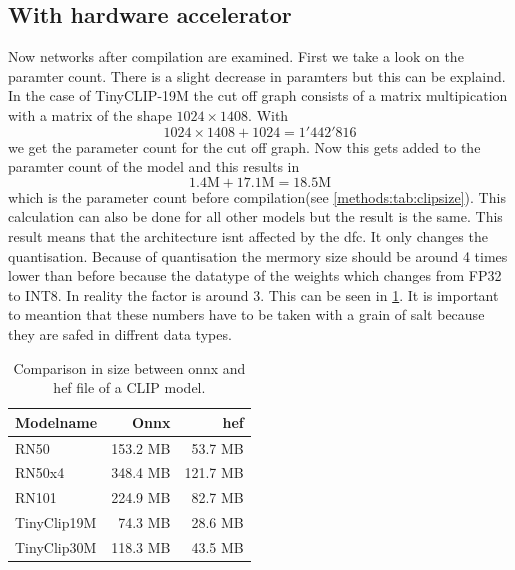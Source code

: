 \subsection{With hardware accelerator}

Now networks after compilation are examined.
First we take a look on the paramter count.
There is a slight decrease in paramters but this can be explaind.
In the case of TinyCLIP-19M the cut off graph consists of a matrix multipication with a matrix of the shape \(1024 \times 1408\).
With 
\begin{equation*}
    1024 \times 1408 + 1024 = 1'442'816
\end{equation*}
we get the parameter count for the cut off graph.
Now this gets added to the paramter count of the model and this results in 
\begin{equation*}
    1.4 \text{M} + 17.1 \text{M} = 18.5 \text{M} 
\end{equation*}
which is the parameter count before compilation(see \cref{methods:tab:clipsize}).
This calculation can also be done for all other models but the result is the same.
This result means that the architecture isnt affected by the \acrshort{dfc}.
It only changes the quantisation.
Because of quantisation the mermory size should be around 4 times lower than before because the datatype of the weights which changes from FP32 to INT8.
In reality the factor is around 3.
This can be seen in \cref{methods:tab:sizecompare}.
It is important to meantion that these numbers have to be taken with a grain of salt because they are safed in diffrent data types.

\begin{table}
    \centering
    \begin{tabular}{l|rr}
    \hline
    Modelname & Onnx & \acrshort{hef}\\\hline
    RN50 & 153.2 MB & 53.7 MB \\ 
    RN50x4 & 348.4 MB& 121.7 MB  \\ 
    RN101 & 224.9 MB  & 82.7 MB \\
    TinyClip19M & 74.3 MB & 28.6 MB  \\ 
    TinyClip30M & 118.3 MB & 43.5 MB  \\ 
    \end{tabular}
    \caption{Comparison in size between onnx and hef file of a CLIP model.}
    \label{methods:tab:sizecompare}
\end{table}


